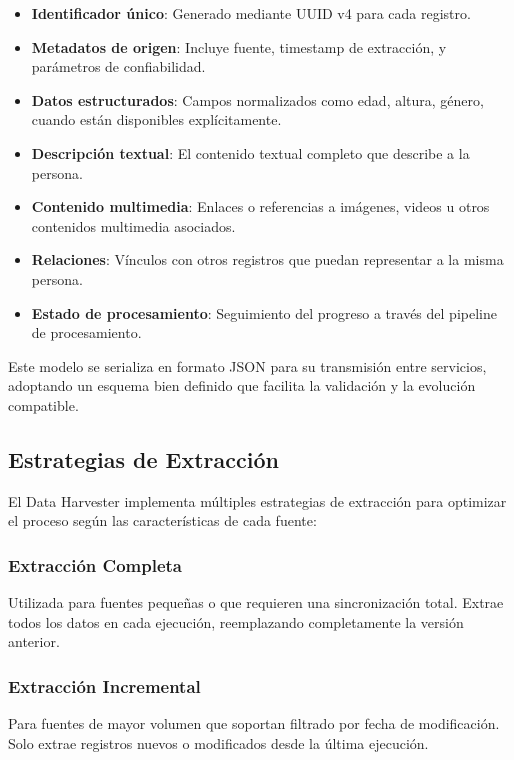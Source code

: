 \documentclass[12pt,a4paper]{article}
\begin{document}
\begin{itemize}
    \item \textbf{Identificador único}: Generado mediante UUID v4 para cada registro.
    \item \textbf{Metadatos de origen}: Incluye fuente, timestamp de extracción, y parámetros de confiabilidad.
    \item \textbf{Datos estructurados}: Campos normalizados como edad, altura, género, cuando están disponibles explícitamente.
    \item \textbf{Descripción textual}: El contenido textual completo que describe a la persona.
    \item \textbf{Contenido multimedia}: Enlaces o referencias a imágenes, videos u otros contenidos multimedia asociados.
    \item \textbf{Relaciones}: Vínculos con otros registros que puedan representar a la misma persona.
    \item \textbf{Estado de procesamiento}: Seguimiento del progreso a través del pipeline de procesamiento.
\end{itemize}

Este modelo se serializa en formato JSON para su transmisión entre servicios, adoptando un esquema bien definido que facilita la validación y la evolución compatible.

\subsection{Estrategias de Extracción}
\label{subsec:dh-estrategias}

El Data Harvester implementa múltiples estrategias de extracción para optimizar el proceso según las características de cada fuente:

\subsubsection{Extracción Completa}
Utilizada para fuentes pequeñas o que requieren una sincronización total. Extrae todos los datos en cada ejecución, reemplazando completamente la versión anterior.

\subsubsection{Extracción Incremental}
Para fuentes de mayor volumen que soportan filtrado por fecha de modificación. Solo extrae registros nuevos o modificados desde la última ejecución.
\end{document}
